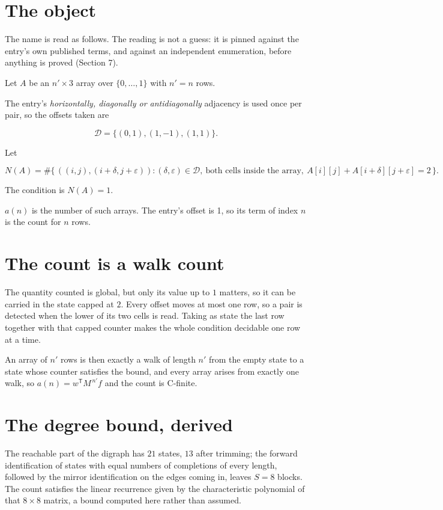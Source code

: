 \documentclass[11pt]{article}
\theoremstyle{definition}
\begin{document}
\section{The object}

The name is read as follows. The reading is not a guess: it is pinned against the entry's own published terms, and against an independent enumeration, before anything is proved (Section 7).

Let $A$ be an $n' \times 3$ array over $\{0,\dots,1\}$ with $n' = n$ rows.

The entry's {\itshape horizontally, diagonally or antidiagonally} adjacency is used once per pair, so the offsets taken are

\[\mathcal{D} = \{(0,1), (1,-1), (1,1)\}.\]

Let

\[N(A) = \#\bigl\{\,((i,j),(i{+}\delta,j{+}\varepsilon)) : (\delta,\varepsilon) \in \mathcal{D},\ \text{both cells inside the array},\ A[i][j] + A[i{+}\delta][j{+}\varepsilon] = 2\,\bigr\}.\]

The condition is $N(A) = 1$.

$a(n)$ is the number of such arrays. The entry's offset is 1, so its term of index $n$ is the count for $n$ rows.

\section{The count is a walk count}

The quantity counted is global, but only its value up to $1$ matters, so it can be carried in the state capped at $2$. Every offset moves at most one row, so a pair is detected when the lower of its two cells is read. Taking as state the last row together with that capped counter makes the whole condition decidable one row at a time.

An array of $n'$ rows is then exactly a walk of length $n'$ from the empty state to a state whose counter satisfies the bound, and every array arises from exactly one walk, so $a(n) = w^{\mathsf T}M^{\,n'}f$ and the count is C-finite.

\section{The degree bound, derived}

The reachable part of the digraph has $21$ states, $13$ after trimming; the forward identification of states with equal numbers of completions of every length, followed by the mirror identification on the edges coming in, leaves $S = 8$ blocks. The count satisfies the linear recurrence given by the characteristic polynomial of that $8\times8$ matrix, a bound computed here rather than assumed.
\end{document}
